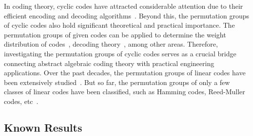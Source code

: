 \documentclass[journal,12pt,onecolumn]{IEEEtran}
\begin{document}
In coding theory, cyclic codes have attracted considerable attention due to their efficient encoding and decoding algorithms~\cite{Blahut_2003}. Beyond this, the permutation groups of cyclic codes also hold significant theoretical and practical importance. The permutation groups of given codes can be applied to determine the weight distribution of codes~\cite{macwilliams1977}, decoding theory~\cite{huffman1998,9492151,1013146}, among other areas. Therefore, investigating the permutation groups of cyclic codes serves as a crucial bridge connecting abstract algebraic coding theory with practical engineering applications. Over the past decades, the permutation groups of linear codes have been extensively studied~\cite{PHELPS198645,BERGER19931,GHORPADE201380,9685181}. But so far, the permutation groups of only a few classes of linear codes have been classified, such as Hamming codes, Reed-Muller codes, etc~\cite{huffman1998}. 


\subsection{Known Results}
\end{document}
